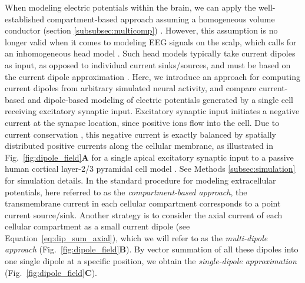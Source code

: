 \documentclass[preprint,10pt,authoryear]{elsarticle}
\newcommand{\hlb}[2][NavyBlue]{ {\sethlcolor{#1} \hl{#2}} }
\newcommand{\hlg}[2][Emerald]{ {\sethlcolor{#1} \hl{#2}} }
\newcommand{\hlp}[2][Purple]{ {\sethlcolor{#1} \hl{#2}} }
\newcommand{\snnote}[1]{\color{white}{\hlb{SN: #1 }}\color{black}}
\newcommand{\sntxt}[1]{{\color{NavyBlue}#1}}
\newcommand{\tvnnote}[1]{\color{white}{\hlg{TVN: #1 }}\color{black}}
\newcommand{\gen}[1]{\color{white}{\hlp{GTE: #1 }}\color{black}}
\begin{document}
When modeling electric potentials within the brain, we can apply the well-established compartment-based approach assuming a homogeneous volume conductor (section \ref{subsubsec:multicomp}) \citep{EINEVOLL2013REVIEW,HOLT1999}.
However, this assumption is no longer valid when it comes to modeling EEG signals on the scalp, which calls for an inhomogeneous head model \citep{Ilmoniemi2019}. Such head models typically take current dipoles as input, as opposed to individual current sinks/sources, and must be based on the current dipole approximation \citep{NUNEZ2006}. Here, we introduce an approach for computing current dipoles from arbitrary simulated neural activity, and compare current-based and dipole-based modeling of electric potentials generated by a single cell receiving excitatory synaptic input.
Excitatory synaptic input initiates a negative current at the synapse location, since positive ions flow into the cell. Due to current conservation \citep{Koch1999}, this negative current is exactly balanced by spatially distributed positive currents along the cellular membrane, as illustrated in Fig.~\ref{fig:dipole_field}\textbf{A} for a single apical excitatory synaptic input to a passive human cortical layer-2/3 pyramidal cell model \citep{EYAL2016}. See Methods \ref{subsec:simulation} for simulation details.
In the standard procedure for modeling extracellular potentials, here referred to as the {\it compartment-based approach}, the transmembrane current in each cellular compartment corresponds to a point current source/sink. Another strategy is to consider the axial current of each cellular compartment as a small current dipole (see Equation~\eqref{eq:dip_sum_axial}), which we will refer to as the {\it multi-dipole approach} (Fig.~\ref{fig:dipole_field}\textbf{B}). By vector summation of all these dipoles into one single dipole at a specific position, we obtain the {\it single-dipole approximation} (Fig.~\ref{fig:dipole_field}\textbf{C}).
\end{document}
